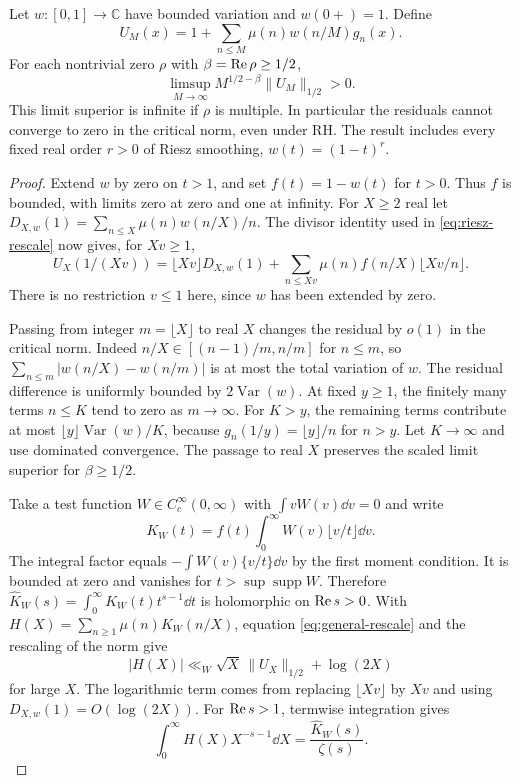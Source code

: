 \begin{theorem}\label{thm:holder}
Let \(w:[0,1]\to\mathbb C\) have bounded variation and \(w(0+)=1\). Define
\[
 U_M(x)=1+\sum_{n\le M}\mu(n)w(n/M)g_n(x).
\]
For each nontrivial zero \(\rho\) with \(\beta=\operatorname{Re}\rho\ge1/2\),
\[
 \limsup_{M\to\infty} M^{1/2-\beta}\|U_M\|_{1/2}>0.
\]
This limit superior is infinite if \(\rho\) is multiple. In particular the residuals cannot converge to zero in the critical norm, even under RH. The result includes every fixed real order \(r>0\) of Riesz smoothing, \(w(t)=(1-t)^r\).
\end{theorem}
\begin{proof}
Extend \(w\) by zero on \(t>1\), and set \(f(t)=1-w(t)\) for \(t>0\). Thus \(f\) is bounded, with limits zero at zero and one at infinity. For \(X\ge2\) real let \(D_{X,w}(1)=\sum_{n\le X}\mu(n)w(n/X)/n\). The divisor identity used in \eqref{eq:riesz-rescale} now gives, for \(Xv\ge1\),
\begin{equation}\label{eq:general-rescale}
 U_X(1/(Xv))=\lfloor Xv\rfloor D_{X,w}(1)
       +\sum_{n\le Xv}\mu(n)f(n/X)\lfloor Xv/n\rfloor .
\end{equation}
There is no restriction \(v\le1\) here, since \(w\) has been extended by zero.

Passing from integer \(m=\lfloor X\rfloor\) to real \(X\) changes the residual by \(o(1)\) in the critical norm. Indeed \(n/X\in[(n-1)/m,n/m]\) for \(n\le m\), so \(\sum_{n\le m}|w(n/X)-w(n/m)|\) is at most the total variation of \(w\). The residual difference is uniformly bounded by \(2\operatorname{Var}(w)\). At fixed \(y\ge1\), the finitely many terms \(n\le K\) tend to zero as \(m\to\infty\). For \(K>y\), the remaining terms contribute at most \(\lfloor y\rfloor\operatorname{Var}(w)/K\), because \(g_n(1/y)=\lfloor y\rfloor/n\) for \(n>y\). Let \(K\to\infty\) and use dominated convergence. The passage to real \(X\) preserves the scaled limit superior for \(\beta\ge1/2\).

Take a test function \(W\in C_c^\infty(0,\infty)\) with \(\int vW(v)\dd v=0\) and write
\[
 K_W(t)=f(t)\int_0^\infty W(v)\lfloor v/t\rfloor\dd v .
\]
The integral factor equals \(-\int W(v)\{v/t\}\dd v\) by the first moment condition. It is bounded at zero and vanishes for \(t>\sup\operatorname{supp} W\). Therefore \(\widehat K_W(s)=\int_0^\infty K_W(t)t^{s-1}\dd t\) is holomorphic on \(\operatorname{Re} s>0\). With \(H(X)=\sum_{n\ge1}\mu(n)K_W(n/X)\), equation \eqref{eq:general-rescale} and the rescaling of the norm give
\[
 |H(X)|\ll_W \sqrt X\,\|U_X\|_{1/2}+\log(2X)
\]
for large \(X\). The logarithmic term comes from replacing \(\lfloor Xv\rfloor\) by \(Xv\) and using \(D_{X,w}(1)=O(\log(2X))\). For \(\operatorname{Re} s>1\), termwise integration gives
\begin{equation}\label{eq:general-inverse}
 \int_0^\infty H(X)X^{-s-1}\dd X=\frac{\widehat K_W(s)}{\zeta(s)} .
\end{equation}


\end{proof}
